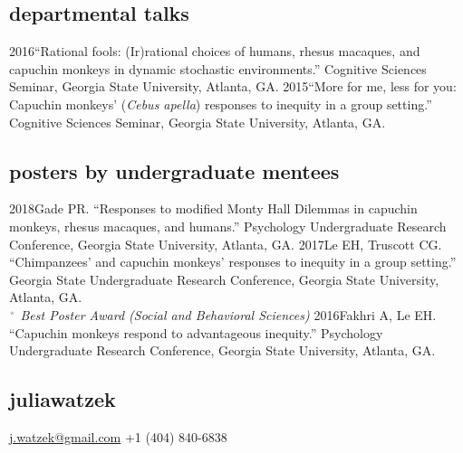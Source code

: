 \documentclass[]{friggeri-cv}
\begin{document}


\subsection{departmental talks}

\begin{entrylist2}
  \entrytwo
    {2016}{``Rational fools: (Ir)rational choices of humans, rhesus macaques, and capuchin monkeys in dynamic stochastic environments.'' Cognitive Sciences Seminar, Georgia State University, Atlanta, GA.}
  \entrytwo
    {2015}{``More for me, less for you: Capuchin monkeys' (\emph{Cebus apella}) responses to inequity in a group setting.'' Cognitive Sciences Seminar, Georgia State University, Atlanta, GA.}
\end{entrylist2}


\subsection{posters by undergraduate mentees}

\begin{entrylist2}
  \entrytwo
    {2018}{Gade PR. ``Responses to modified Monty Hall Dilemmas in capuchin monkeys, rhesus macaques, and humans.'' Psychology Undergraduate Research Conference, Georgia State University, Atlanta, GA.}
  \entrytwo
    {2017}{Le EH, Truscott CG. ``Chimpanzees' and capuchin monkeys' responses to inequity in a group setting.'' Georgia State Undergraduate Research Conference, Georgia State University, Atlanta, GA.\\
    {\quad\small{} $\color{lightgray} {}^\star$ \emph{\color{lightgray} Best Poster Award (Social and Behavioral Sciences)}}}
  \entrytwo
    {2016}{Fakhri A, Le EH. ``Capuchin monkeys respond to advantageous inequity.'' Psychology Undergraduate Research Conference, Georgia State University, Atlanta, GA.}
\end{entrylist2}



\begin{aside}
  \section{{\normalfont julia}watzek}
    \href{mailto:j.watzek@gmail.com}{j.watzek@gmail.com}
    +1 (404) 840-6838
\end{aside}
\end{document}
